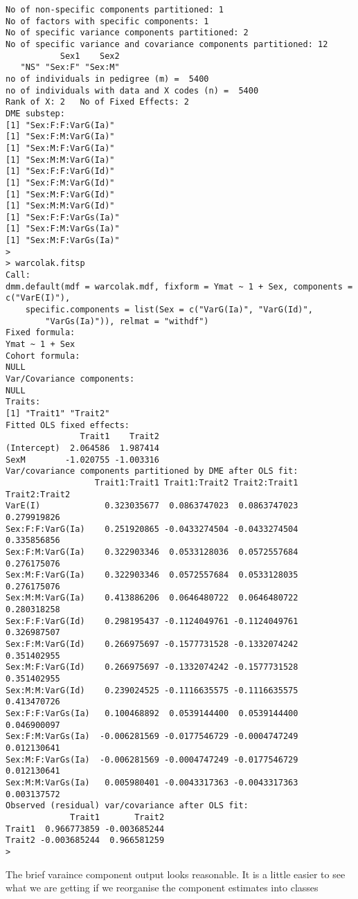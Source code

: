 \documentclass[titlepage]{article}  %
\begin{document}
\begin{verbatim}
No of non-specific components partitioned: 1 
No of factors with specific components: 1 
No of specific variance components partitioned: 2 
No of specific variance and covariance components partitioned: 12 
           Sex1    Sex2 
   "NS" "Sex:F" "Sex:M" 
no of individuals in pedigree (m) =  5400 
no of individuals with data and X codes (n) =  5400 
Rank of X: 2   No of Fixed Effects: 2 
DME substep:
[1] "Sex:F:F:VarG(Ia)"
[1] "Sex:F:M:VarG(Ia)"
[1] "Sex:M:F:VarG(Ia)"
[1] "Sex:M:M:VarG(Ia)"
[1] "Sex:F:F:VarG(Id)"
[1] "Sex:F:M:VarG(Id)"
[1] "Sex:M:F:VarG(Id)"
[1] "Sex:M:M:VarG(Id)"
[1] "Sex:F:F:VarGs(Ia)"
[1] "Sex:F:M:VarGs(Ia)"
[1] "Sex:M:F:VarGs(Ia)"
>
> warcolak.fitsp
Call:
dmm.default(mdf = warcolak.mdf, fixform = Ymat ~ 1 + Sex, components = c("VarE(I)"), 
    specific.components = list(Sex = c("VarG(Ia)", "VarG(Id)", 
        "VarGs(Ia)")), relmat = "withdf")
Fixed formula:
Ymat ~ 1 + Sex
Cohort formula:
NULL
Var/Covariance components:
NULL
Traits:
[1] "Trait1" "Trait2"
Fitted OLS fixed effects:
               Trait1    Trait2
(Intercept)  2.064586  1.987414
SexM        -1.020755 -1.003316
Var/covariance components partitioned by DME after OLS fit:
                  Trait1:Trait1 Trait1:Trait2 Trait2:Trait1 Trait2:Trait2
VarE(I)             0.323035677  0.0863747023  0.0863747023   0.279919826
Sex:F:F:VarG(Ia)    0.251920865 -0.0433274504 -0.0433274504   0.335856856
Sex:F:M:VarG(Ia)    0.322903346  0.0533128036  0.0572557684   0.276175076
Sex:M:F:VarG(Ia)    0.322903346  0.0572557684  0.0533128035   0.276175076
Sex:M:M:VarG(Ia)    0.413886206  0.0646480722  0.0646480722   0.280318258
Sex:F:F:VarG(Id)    0.298195437 -0.1124049761 -0.1124049761   0.326987507
Sex:F:M:VarG(Id)    0.266975697 -0.1577731528 -0.1332074242   0.351402955
Sex:M:F:VarG(Id)    0.266975697 -0.1332074242 -0.1577731528   0.351402955
Sex:M:M:VarG(Id)    0.239024525 -0.1116635575 -0.1116635575   0.413470726
Sex:F:F:VarGs(Ia)   0.100468892  0.0539144400  0.0539144400   0.046900097
Sex:F:M:VarGs(Ia)  -0.006281569 -0.0177546729 -0.0004747249   0.012130641
Sex:M:F:VarGs(Ia)  -0.006281569 -0.0004747249 -0.0177546729   0.012130641
Sex:M:M:VarGs(Ia)   0.005980401 -0.0043317363 -0.0043317363   0.003137572
Observed (residual) var/covariance after OLS fit:
             Trait1       Trait2
Trait1  0.966773859 -0.003685244
Trait2 -0.003685244  0.966581259
> 
\end{verbatim}
The brief varaince component output looks reasonable. It is a little easier to see what we are getting if we reorganise the component estimates into classes
\end{document}
